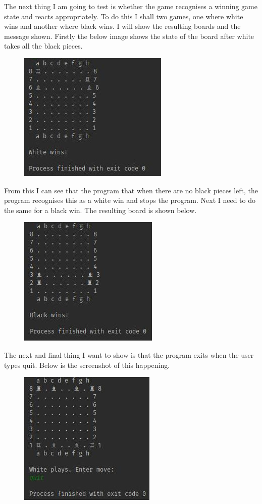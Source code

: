 \documentclass[a4paper]{article}
\begin{document}
The next thing I am going to test is whether the game recognises a winning game state and reacts appropriately. To do this I shall two games, one where white wins and another where black wins. I will show the resulting boards and the message shown. Firstly the below image shows the state of the board after white takes all the black pieces.
\begin{figure}[H]
\centering
\includegraphics[scale=2.5]{whiteWins}
\end{figure}

From this I can see that the program that when there are no black pieces left, the program recognises this as a white win and stops the program. Next I need to do the same for a black win. The resulting board is shown below.
\begin{figure}[H]
\centering
\includegraphics[scale=2.5]{blackWins}
\end{figure}

The next and final thing I want to show is that the program exits when the user types quit. Below is the screenshot of this happening.
\begin{figure}[H]
\centering
\includegraphics[scale=2.5]{quit}
\end{figure}
\end{document}
